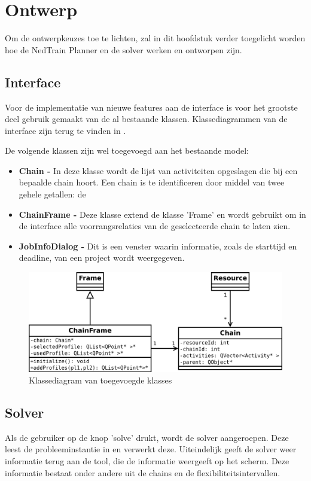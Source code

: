 \section{Ontwerp}
Om de ontwerpkeuzes toe te lichten, zal in dit hoofdstuk verder toegelicht worden hoe de NedTrain Planner en de solver werken en ontworpen zijn.

\subsection{Interface}
Voor de implementatie van nieuwe features aan de interface is voor het grootste deel gebruik gemaakt van de al bestaande klassen. Klassediagrammen van de interface zijn terug te vinden in \cite{bep2012nedtrain}.

De volgende klassen zijn wel toegevoegd aan het bestaande model:
\begin{itemize}
\item \textbf{Chain -} In deze klasse wordt de lijst van activiteiten opgeslagen die bij een bepaalde chain hoort. Een chain is te identificeren door middel van twee gehele getallen: de 
\item \textbf{ChainFrame -} Deze klasse extend de klasse 'Frame' en wordt gebruikt om in de interface alle voorrangsrelaties van de geselecteerde chain te laten zien.
\item \textbf{JobInfoDialog -} Dit is een venster waarin informatie, zoals de starttijd en deadline, van een project wordt weergegeven.
\end{itemize}

\begin{figure}[H]
\centering
\includegraphics[width=.95\textwidth]{../images/klasse-diagram.png}
\caption{Klassediagram van toegevoegde klasses}
\label{fig:klass-dia}
\end{figure}

\subsection{Solver}
Als de gebruiker op de knop 'solve' drukt, wordt de solver aangeroepen. Deze leest de probleeminstantie in en verwerkt deze. Uiteindelijk geeft de solver weer informatie terug aan de tool, die de informatie weergeeft op het scherm. Deze informatie bestaat onder andere uit de chains en de flexibiliteitsintervallen.

